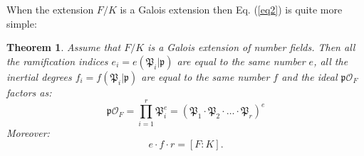 \documentclass[12pt]{article}
\newtheorem{thm}{Theorem}
\newcommand{\p}{{\mathfrak{p}}}
\renewcommand{\P}{{\mathfrak{P}}}
\newcommand{\intF}{\mathcal{O}_F}
\begin{document}
When the extension $F/K$ is a Galois extension then Eq. (\ref{eq2}) is quite more simple:

\begin{thm}
Assume that $F/K$ is a Galois extension of number fields. Then all the ramification indices $e_i=e(\P_i|\p)$ are equal to the same number $e$, all the inertial degrees $f_i=f(\P_i|\p)$ are equal to the same number $f$ and the ideal $\p \intF$ factors as:
$$\p\intF = \prod_{i=1}^r \P_i^e=(\P_1\cdot\P_2\cdot\ldots\cdot\P_r)^e$$
Moreover:
$$e\cdot f\cdot r=[F:K].$$
\end{thm}
\end{document}

